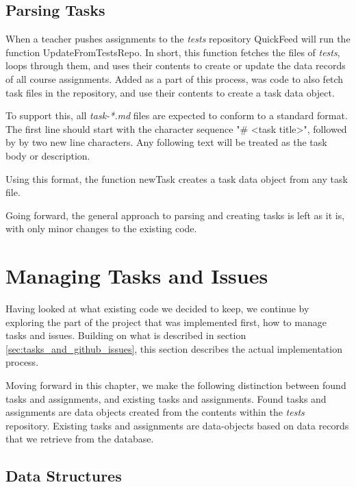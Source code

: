 \subsection{Parsing Tasks}
\label{sec:parsing_tasks}

When a teacher pushes assignments to the \textit{tests} repository QuickFeed will run the function UpdateFromTestsRepo.
In short, this function fetches the files of \textit{tests}, loops through them, and uses their contents to create or update the data records of all course assignments.
Added as a part of this process, was code to also fetch task files in the repository, and use their contents to create a task data object.

To support this, all \textit{task-*.md} files are expected to conform to a standard format.
The first line should start with the character sequence "\# <task title>", followed by by two new line characters.
Any following text will be treated as the task body or description.

Using this format, the function newTask creates a task data object from any task file.



Going forward, the general approach to parsing and creating tasks is left as it is, with only minor changes to the existing code.

\section{Managing Tasks and Issues}

Having looked at what existing code we decided to keep, we continue by exploring the part of the project that was implemented first, how to manage tasks and issues.
Building on what is described in section \ref{sec:tasks_and_github_issues}, this section describes the actual implementation process.

Moving forward in this chapter, we make the following distinction between found tasks and assignments, and existing tasks and assignments.
Found tasks and assignments are data objects created from the contents within the \textit{tests} repository.
Existing tasks and assignments are data-objects based on data records that we retrieve from the database.

\subsection{Data Structures}

